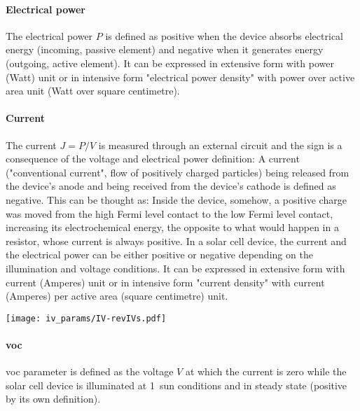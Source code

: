 		\paragraph{Electrical power} The electrical power $P$ is defined as positive when the device absorbs electrical energy (incoming, passive element) and negative when it generates energy (outgoing, active element).
		It can be expressed in extensive form with power (Watt) unit or in intensive form "electrical power density" with power over active area unit (Watt over square centimetre).

		\paragraph{Current} The current $J=P/V$ is measured through an external circuit and the sign is a consequence of the voltage and electrical power definition: A current ("conventional current", flow of positively charged particles) being released from the device's anode and being received from the device's cathode is defined as negative.
		This can be thought as: Inside the device, somehow, a positive charge was moved from the high Fermi level contact to the low Fermi level contact, increasing its electrochemical energy, the opposite to what would happen in a resistor, whose current is always positive.
		In a solar cell device, the current and the electrical power can be either positive or negative depending on the illumination and voltage conditions.
		It can be expressed in extensive form with current (Amperes) unit or in intensive form "current density" with current (Amperes) per active area (square centimetre) unit.

		\begin{SCfigure}
			\centering
			\texttt{[image: iv\_params/IV-revIVs.pdf]}
			\label{fig:iv_params}
		\end{SCfigure}

		\paragraph{\Glsdesc{voc}} \Gls{voc} parameter is defined as the voltage $V$ at which the current is zero while the solar cell device is illuminated at 1~sun conditions and in steady state (positive by its own definition).

